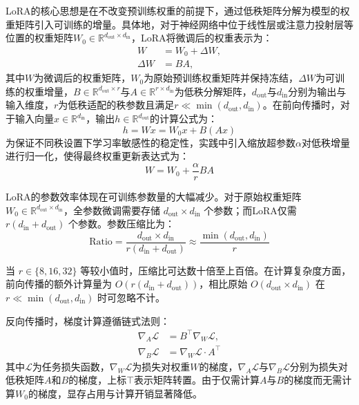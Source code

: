 LoRA的核心思想是在不改变预训练权重的前提下，通过低秩矩阵分解为模型的权重矩阵引入可训练的增量。具体地，对于神经网络中位于线性层或注意力投射层等位置的权重矩阵$W_0\in\mathbb{R}^{d_{\text{out}}\times d_{\text{in}}}$，LoRA将微调后的权重表示为：
\begin{equation}\label{eq:lora_core}
\begin{aligned}
      W &= W_0 + \Delta W, \\
      \Delta W &= BA,
\end{aligned}
\end{equation}
其中$W$为微调后的权重矩阵，$W_0$为原始预训练权重矩阵并保持冻结，$\Delta W$为可训练的权重增量，$B\in\mathbb{R}^{d_{\text{out}}\times r}$与$A\in\mathbb{R}^{r\times d_{\text{in}}}$为低秩分解矩阵，$d_{\text{out}}$与$d_{\text{in}}$分别为输出与输入维度，$r$为低秩适配的秩参数且满足$r\ll\min(d_{\text{out}}, d_{\text{in}})$。在前向传播时，对于输入向量$x\in\mathbb{R}^{d_{\text{in}}}$，输出$h\in\mathbb{R}^{d_{\text{out}}}$的计算公式为：
\begin{equation}\label{eq:lora_forward}
      h = Wx = W_0 x + B(Ax)
\end{equation}
为保证不同秩设置下学习率敏感性的稳定性，实践中引入缩放超参数$\alpha$对低秩增量进行归一化，使得最终权重更新表达式为：
\begin{equation}\label{eq:lora_scaling}
      W = W_0 + \frac{\alpha}{r} BA
\end{equation}

LoRA的参数效率体现在可训练参数量的大幅减少。对于原始权重矩阵 $W_0\in\mathbb{R}^{d_{\text{out}}\times d_{\text{in}}}$，全参数微调需要存储 $d_{\text{out}}\times d_{\text{in}}$ 个参数；而LoRA仅需 $r(d_{\text{in}}+d_{\text{out}})$ 个参数。参数压缩比为：
\begin{equation}\label{eq:lora_compression_ratio}
      \text{Ratio} = \frac{d_{\text{out}}\times d_{\text{in}}}{r(d_{\text{in}}+d_{\text{out}})} \approx \frac{\min(d_{\text{out}}, d_{\text{in}})}{r}
\end{equation}

当 $r\in\{8,16,32\}$ 等较小值时，压缩比可达数十倍至上百倍。在计算复杂度方面，前向传播的额外计算量为 $O(r(d_{\text{in}}+d_{\text{out}}))$，相比原始 $O(d_{\text{out}}\times d_{\text{in}})$ 在 $r\ll\min(d_{\text{out}}, d_{\text{in}})$ 时可忽略不计。

反向传播时，梯度计算遵循链式法则：
\begin{equation}\label{eq:lora_gradients}
\begin{aligned}
      \nabla_A \mathcal{L} &= B^{\top} \nabla_{W}\mathcal{L}, \\
      \nabla_B \mathcal{L} &= \nabla_{W}\mathcal{L} \cdot A^{\top}
\end{aligned}
\end{equation}
其中$\mathcal{L}$为任务损失函数，$\nabla_{W}\mathcal{L}$为损失对权重$W$的梯度，$\nabla_A \mathcal{L}$与$\nabla_B \mathcal{L}$分别为损失对低秩矩阵$A$和$B$的梯度，上标$\top$表示矩阵转置。由于仅需计算$A$与$B$的梯度而无需计算$W_0$的梯度，显存占用与计算开销显著降低。

